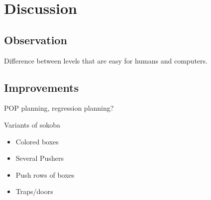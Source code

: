 
\chapter{Discussion}
\label{cha:discussion}

\section{Observation}
Difference between levels that are easy for humans and computers.

\section{Improvements}
POP planning, regression planning?

Variants of sokoba 
\begin{itemize}
\item Colored boxes
\item Several Pushers
\item Push rows of boxes
\item Traps/doors
\end{itemize}